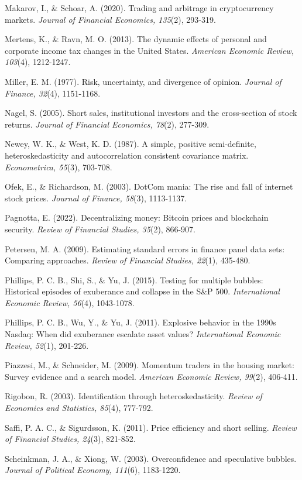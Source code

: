 \documentclass[
]{article}
\begin{document}
Makarov, I., \& Schoar, A. (2020). Trading and arbitrage in
cryptocurrency markets. \emph{Journal of Financial Economics, 135}(2),
293-319.

Mertens, K., \& Ravn, M. O. (2013). The dynamic effects of personal and
corporate income tax changes in the United States. \emph{American
Economic Review, 103}(4), 1212-1247.

Miller, E. M. (1977). Risk, uncertainty, and divergence of opinion.
\emph{Journal of Finance, 32}(4), 1151-1168.

Nagel, S. (2005). Short sales, institutional investors and the
cross-section of stock returns. \emph{Journal of Financial Economics,
78}(2), 277-309.

Newey, W. K., \& West, K. D. (1987). A simple, positive semi-definite,
heteroskedasticity and autocorrelation consistent covariance matrix.
\emph{Econometrica, 55}(3), 703-708.

Ofek, E., \& Richardson, M. (2003). DotCom mania: The rise and fall of
internet stock prices. \emph{Journal of Finance, 58}(3), 1113-1137.

Pagnotta, E. (2022). Decentralizing money: Bitcoin prices and blockchain
security. \emph{Review of Financial Studies, 35}(2), 866-907.

Petersen, M. A. (2009). Estimating standard errors in finance panel data
sets: Comparing approaches. \emph{Review of Financial Studies, 22}(1),
435-480.

Phillips, P. C. B., Shi, S., \& Yu, J. (2015). Testing for multiple
bubbles: Historical episodes of exuberance and collapse in the S\&P 500.
\emph{International Economic Review, 56}(4), 1043-1078.

Phillips, P. C. B., Wu, Y., \& Yu, J. (2011). Explosive behavior in the
1990s Nasdaq: When did exuberance escalate asset values?
\emph{International Economic Review, 52}(1), 201-226.

Piazzesi, M., \& Schneider, M. (2009). Momentum traders in the housing
market: Survey evidence and a search model. \emph{American Economic
Review, 99}(2), 406-411.

Rigobon, R. (2003). Identification through heteroskedasticity.
\emph{Review of Economics and Statistics, 85}(4), 777-792.

Saffi, P. A. C., \& Sigurdsson, K. (2011). Price efficiency and short
selling. \emph{Review of Financial Studies, 24}(3), 821-852.

Scheinkman, J. A., \& Xiong, W. (2003). Overconfidence and speculative
bubbles. \emph{Journal of Political Economy, 111}(6), 1183-1220.
\end{document}
